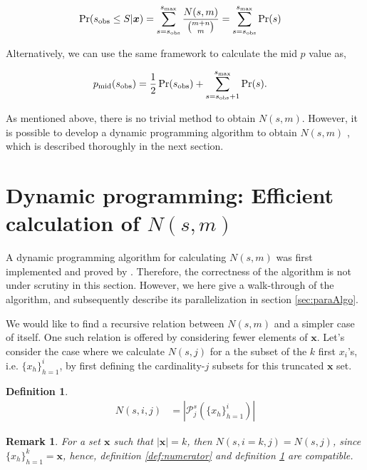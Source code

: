 \documentclass[a4paper]{article}
\newtheorem{mydef}{Definition}
\newtheorem{myremark}{Remark}
\begin{document}
\begin{align}
\Pr(s_{\text{\rm obs}} \leq S | \bm{x}) &= \sum _{s=s_{\rm obs}}^{s_{\rm max}}\frac{N(s,m)}{{m+n \choose m}}=\sum _{s=s_{\rm obs}}^{s_{\rm max}}\Pr(s)
\end{align}

Alternatively, we can use the same framework to calculate the mid $p$ value \cite{routledge1994practicing} as, 

\begin{align}
p_{\rm mid}(s_{\rm obs}) &= \frac{1}{2}\Pr(s_{\rm obs}) +\sum _{s=s_{\rm obs}+1}^{s_{\rm max}}\Pr(s).
\end{align}

As mentioned above, there is no trivial method to obtain $N(s,m)$. However, it is possible to develop a  dynamic programming algorithm to obtain $N(s,m)$ \cite{pagano_trichtler1983, zimmermann1985}, which is described thoroughly in the next section.

\section{Dynamic programming: Efficient calculation of $N(s,m)$}
\label{sec:calcBottleneck}

A dynamic programming algorithm for calculating $N(s,m)$ was first implemented and proved by \cite{zimmermann1985, pagano_trichtler1983}. Therefore, the correctness of the algorithm is not under scrutiny in this section. However, we here give a walk-through of the algorithm, and subsequently describe its parallelization in section \ref{sec:paraAlgo}.

We would like to find a recursive relation between $N(s,m)$ and a simpler case of itself. One such relation is offered by considering fewer elements of $\bm{x}$. Let's consider the case where we calculate $N(s,j)$ for a the subset of the $k$ first $x_i$'s, i.e. $\{ x_h \}^i_{h=1}$, by first defining the cardinality-$j$ subsets for this truncated $\bm{x}$ set. 

\begin{mydef}
\label{def:specificNumerator}
\begin{align*}
N(s,i,j)&= |\mathcal{P}^s_j(\{ x_h \}^i_{h=1})|
\end{align*}
\end{mydef}
\begin{myremark}
\label{rm:finalN}
For a set $\bm{x}$ such that $|\bm{x}|=k$, then $N(s,i=k,j)=N(s,j)$, since $\{ x_h \}^k_{h=1}=\bm{x}$, hence, definition \ref{def:numerator} and definition \ref{def:specificNumerator} are compatible.
\end{myremark}
\end{document}
